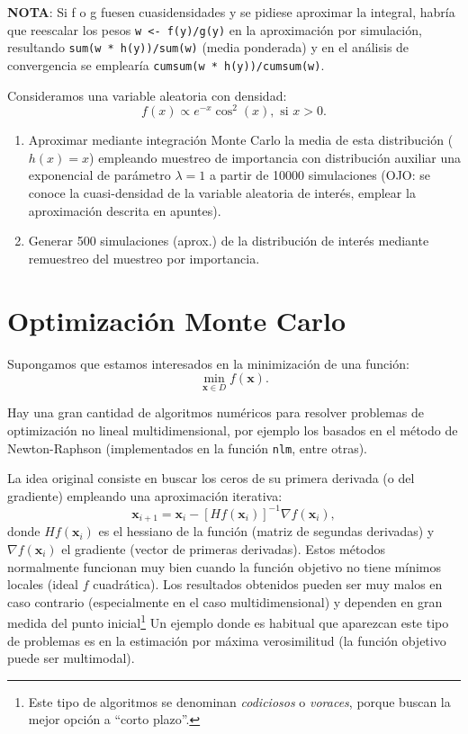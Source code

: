 \documentclass[
]{book}
\theoremstyle{break}
\theoremstyle{definition}
\theoremstyle{definition}
\theoremstyle{definition}
\theoremstyle{remark}
\let\BeginKnitrBlock\begin \let\EndKnitrBlock\end
\begin{document}
\textbf{NOTA}: Si f o g fuesen cuasidensidades y se pidiese aproximar la integral, habría que reescalar los pesos \texttt{w\ \textless{}-\ f(y)/g(y)} en la aproximación por simulación, resultando \texttt{sum(w\ *\ h(y))/sum(w)} (media ponderada) y en el análisis de convergencia se emplearía \texttt{cumsum(w\ *\ h(y))/cumsum(w)}.

\BeginKnitrBlock{exercise}[propuesto]
\protect\hypertarget{exr:mc-imp-sample2}{}{\label{exr:mc-imp-sample2} {} }
\EndKnitrBlock{exercise}

Consideramos una variable aleatoria con densidad:
\[f(x)\propto e^{-x}\cos^{2}(x),\text{ si }x>0.\]

\begin{enumerate}
\def\labelenumi{\alph{enumi}.}
\item
  Aproximar mediante integración Monte Carlo la media de esta
  distribución (\(h(x)=x\)) empleando muestreo de importancia con
  distribución auxiliar una exponencial de parámetro \(\lambda=1\) a
  partir de 10000 simulaciones (OJO: se conoce la cuasi-densidad
  de la variable aleatoria de interés, emplear la aproximación descrita
  en apuntes).
\item
  Generar 500 simulaciones (aprox.) de la distribución de interés
  mediante remuestreo del muestreo por importancia.
\end{enumerate}

\hypertarget{optimizaciuxf3n-monte-carlo}{%
\section{Optimización Monte Carlo}\label{optimizaciuxf3n-monte-carlo}}

Supongamos que estamos interesados en la minimización de una función:
\[\underset{\mathbf{x}\in D}{\min }f(\mathbf{x}).\]

Hay una gran cantidad de algoritmos numéricos para resolver problemas de optimización no lineal multidimensional, por ejemplo los basados en el método de Newton-Raphson
(implementados en la función \texttt{nlm}, entre otras).

La idea original consiste en buscar los ceros de su primera derivada (o del gradiente) empleando una aproximación iterativa:
\[\mathbf{x}_{i+1} = \mathbf{x}_i-[Hf(\mathbf{x}_i)]^{-1}\nabla f(\mathbf{x}_i),\]
donde \(Hf(\mathbf{x}_i)\) es el hessiano de la función (matriz de segundas derivadas) y \(\nabla f(\mathbf{x}_i)\) el gradiente (vector de primeras derivadas).
Estos métodos normalmente funcionan muy bien cuando la función objetivo no tiene mínimos locales (ideal \(f\) cuadrática).
Los resultados obtenidos pueden ser muy malos en caso contrario (especialmente en el caso multidimensional) y dependen en gran medida del punto inicial\footnote{Este tipo de algoritmos se denominan \emph{codiciosos} o \emph{voraces}, porque buscan la mejor opción a ``corto plazo''.}
Un ejemplo donde es habitual que aparezcan este tipo de problemas es en la estimación por máxima verosimilitud (la función objetivo puede ser multimodal).
\end{document}
